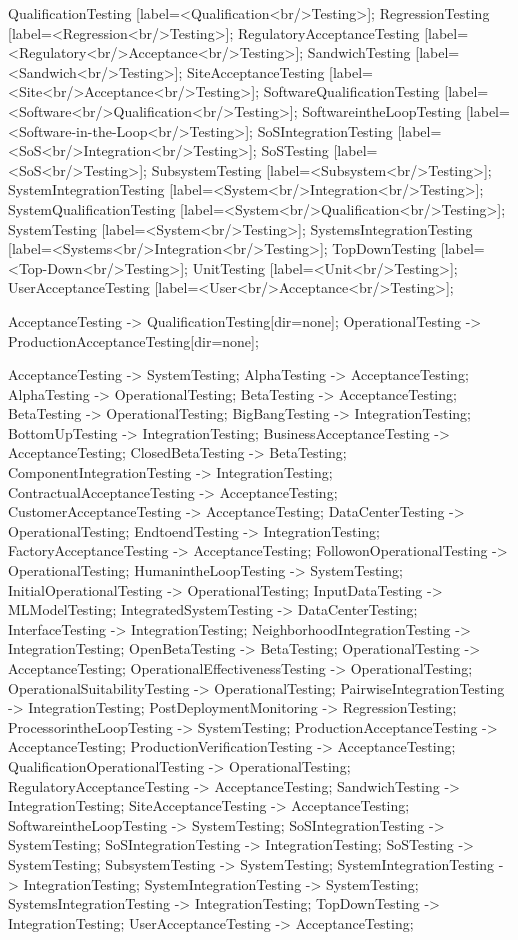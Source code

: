 \documentclass{article}
\begin{document}
{QualificationTesting [label=<Qualification<br/>Testing>];
RegressionTesting [label=<Regression<br/>Testing>];
RegulatoryAcceptanceTesting [label=<Regulatory<br/>Acceptance<br/>Testing>];
SandwichTesting [label=<Sandwich<br/>Testing>];
SiteAcceptanceTesting [label=<Site<br/>Acceptance<br/>Testing>];
SoftwareQualificationTesting [label=<Software<br/>Qualification<br/>Testing>];
SoftwareintheLoopTesting [label=<Software-in-the-Loop<br/>Testing>];
SoSIntegrationTesting [label=<SoS<br/>Integration<br/>Testing>];
SoSTesting [label=<SoS<br/>Testing>];
SubsystemTesting [label=<Subsystem<br/>Testing>];
SystemIntegrationTesting [label=<System<br/>Integration<br/>Testing>];
SystemQualificationTesting [label=<System<br/>Qualification<br/>Testing>];
SystemTesting [label=<System<br/>Testing>];
SystemsIntegrationTesting [label=<Systems<br/>Integration<br/>Testing>];
TopDownTesting [label=<Top-Down<br/>Testing>];
UnitTesting [label=<Unit<br/>Testing>];
UserAcceptanceTesting [label=<User<br/>Acceptance<br/>Testing>];

AcceptanceTesting -> QualificationTesting[dir=none];
OperationalTesting -> ProductionAcceptanceTesting[dir=none];

AcceptanceTesting -> SystemTesting;
AlphaTesting -> AcceptanceTesting;
AlphaTesting -> OperationalTesting;
BetaTesting -> AcceptanceTesting;
BetaTesting -> OperationalTesting;
BigBangTesting -> IntegrationTesting;
BottomUpTesting -> IntegrationTesting;
BusinessAcceptanceTesting -> AcceptanceTesting;
ClosedBetaTesting -> BetaTesting;
ComponentIntegrationTesting -> IntegrationTesting;
ContractualAcceptanceTesting -> AcceptanceTesting;
CustomerAcceptanceTesting -> AcceptanceTesting;
DataCenterTesting -> OperationalTesting;
EndtoendTesting -> IntegrationTesting;
FactoryAcceptanceTesting -> AcceptanceTesting;
FollowonOperationalTesting -> OperationalTesting;
HumanintheLoopTesting -> SystemTesting;
InitialOperationalTesting -> OperationalTesting;
InputDataTesting -> MLModelTesting;
IntegratedSystemTesting -> DataCenterTesting;
InterfaceTesting -> IntegrationTesting;
NeighborhoodIntegrationTesting -> IntegrationTesting;
OpenBetaTesting -> BetaTesting;
OperationalTesting -> AcceptanceTesting;
OperationalEffectivenessTesting -> OperationalTesting;
OperationalSuitabilityTesting -> OperationalTesting;
PairwiseIntegrationTesting -> IntegrationTesting;
PostDeploymentMonitoring -> RegressionTesting;
ProcessorintheLoopTesting -> SystemTesting;
ProductionAcceptanceTesting -> AcceptanceTesting;
ProductionVerificationTesting -> AcceptanceTesting;
QualificationOperationalTesting -> OperationalTesting;
RegulatoryAcceptanceTesting -> AcceptanceTesting;
SandwichTesting -> IntegrationTesting;
SiteAcceptanceTesting -> AcceptanceTesting;
SoftwareintheLoopTesting -> SystemTesting;
SoSIntegrationTesting -> SystemTesting;
SoSIntegrationTesting -> IntegrationTesting;
SoSTesting -> SystemTesting;
SubsystemTesting -> SystemTesting;
SystemIntegrationTesting -> IntegrationTesting;
SystemIntegrationTesting -> SystemTesting;
SystemsIntegrationTesting -> IntegrationTesting;
TopDownTesting -> IntegrationTesting;
UserAcceptanceTesting -> AcceptanceTesting;

}
\end{document}
